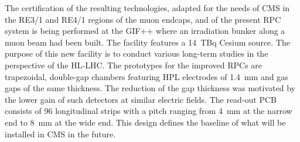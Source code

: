 	The certification of the resulting technologies, adapted for the needs of CMS in the RE3/1 and RE4/1 regions of the muon endcaps, and of the present RPC system is being performed at the \acf{GIF++} where an irradiation bunker along a muon beam had been built. The facility features a \SI{14}{TBq} Cesium source. The purpose of this new facility is to conduct various long-term studies in the perspective of the HL-LHC. The prototypes for the improved RPCs are trapezoidal, double-gap chambers featuring \acf{HPL} electrodes of \SI{1.4}{mm} and gas gaps of the same thickness. The reduction of the gap thickness was motivated by the lower gain of such detectors at similar electric fields. The read-out PCB consists of 96 longitudinal strips with a pitch ranging from \SI{4}{mm} at the narrow end to \SI{8}{mm} at the wide end. This design defines the baseline of what will be installed in CMS in the future.\hspace{5mm}
	
